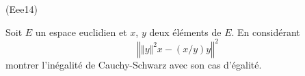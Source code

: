 \begin{tiny}(Eee14)\end{tiny} Soit $E$ un espace euclidien et $x$, $y$ deux éléments de $E$. En considérant
\begin{displaymath}
 \left\Vert \Vert y\Vert^2x - (x/y)y \right \Vert^2
\end{displaymath}
 montrer l'inégalité de Cauchy-Schwarz avec son cas d'égalité.
